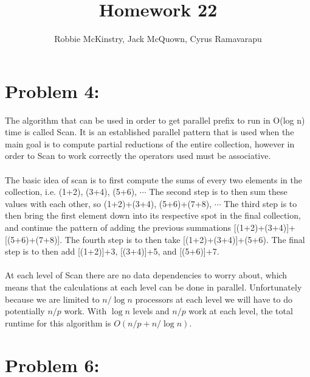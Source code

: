 \documentclass[12pt]{article}
\begin{document}
\title{Homework 22}
\author{Robbie McKinstry, Jack McQuown, Cyrus Ramavarapu}
\renewcommand{\today}{24 October 2016}
\renewcommand{\baselinestretch}{1.5}
\maketitle

\section*{Problem 4: }
The algorithm that can be used in order to get parallel prefix to run in {O(log n)} time is called Scan. It is an established parallel 
pattern that is used when the main goal is to compute partial reductions of the entire collection, however in order to Scan to work 
correctly the operators used must be associative.\\\\
The basic idea of scan is to first compute the sums of every two elements in the collection, i.e. (1+2), (3+4), (5+6), {$\cdots$} The second step is to then sum these values with each other, so (1+2)+(3+4), (5+6)+(7+8), {$\cdots$} The third step is to then bring the first element down into its respective spot in the final collection, and continue the pattern of adding the previous summations
[(1+2)+(3+4)]+[(5+6)+(7+8)]. The fourth step is to then take [(1+2)+(3+4)]+(5+6). The final step is to then add [(1+2)]+3, [(3+4)]+5, and [(5+6)]+7.\\\\
At each level of Scan there are no data dependencies to worry about, which means that the calculations at each level can be done in parallel. Unfortunately because we are limited to {$n/\log n$} processors at each level we will have to do potentially {$n/p$} work. With {$\log n$} levels and {$n/p$} work at each level, the total runtime for this algorithm is {$O(n/p + n/\log n)$}.
\section*{Problem 6: }
\end{document}

